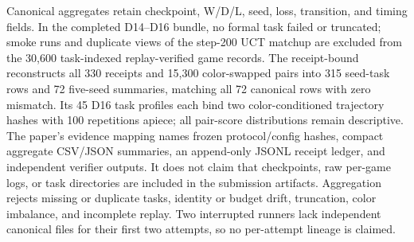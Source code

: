 \documentclass[10pt,letterpaper]{article}
\begin{document}
Canonical aggregates retain checkpoint, W/D/L, seed, loss, transition, and
timing fields. In the completed D14--D16 bundle, no formal task failed or
truncated; smoke runs and duplicate
views of the step-200 UCT matchup are excluded from the 30,600 task-indexed
replay-verified game records. The receipt-bound
 reconstructs all 330
receipts and 15,300 color-swapped pairs into 315 seed-task rows and 72 five-seed
summaries, matching all 72 canonical rows with zero mismatch. Its 45 D16 task
profiles each bind two color-conditioned trajectory hashes with 100 repetitions
apiece; all pair-score distributions remain descriptive. The paper's evidence
mapping names frozen
protocol/config hashes, compact aggregate CSV/JSON summaries, an append-only
JSONL receipt ledger, and independent verifier outputs. It does not claim that checkpoints, raw per-game logs, or
task directories are included in the submission artifacts.
Aggregation rejects missing or duplicate tasks, identity or budget drift,
truncation, color imbalance, and incomplete replay. Two interrupted runners
lack independent canonical files for their first two attempts, so no
per-attempt lineage is claimed.
\end{document}
